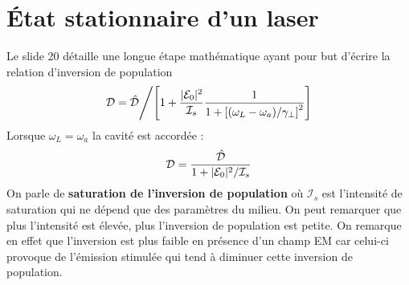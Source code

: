 \section{État stationnaire d'un laser}
Le slide 20 détaille une longue étape mathématique ayant pour but d'écrire la relation d'inversion
de population
\begin{equation}
{{\cal D}} = {{{\hat {\cal D}}} \mathord{\left/
 {\vphantom {{{\hat {\cal D}}} {\left[ {1 + \frac{{|{{\cal E}_0}{|^2}}}{{{{{\cal I}}_s}}}\frac{1}{{1 + {{[({\omega _L} - {\omega _a})/{\gamma _ \bot }]}^2}}}} \right]}}} \right.
 \kern-\nulldelimiterspace} {\left[ {1 + \frac{{|{{\cal E}_0}{|^2}}}{{{{{\cal I}}_s}}}\frac{1}{{1 + {{[({\omega _L} - {\omega _a})/{\gamma _ \bot }]}^2}}}} \right]}}
\label{eq:ch3.5p}
\end{equation}
Lorsque $\omega_L=\omega_a$ la cavité est accordée :
\begin{equation}
{{\cal D}} = \frac{{{\hat {\cal D}}}}{{1 + |{{\cal E}_0}{|^2}/{{{\cal I}}_s}}}
\end{equation}
On parle de \textbf{saturation de l'inversion de population} où $\mathcal{I}_s$ est l'intensité de 
saturation qui ne dépend que des paramètres du milieu. On peut remarquer que plus l'intensité est 
élevée, plus l'inversion de population est petite. On remarque en effet que l'inversion est plus 
faible en présence d'un champ EM car celui-ci provoque de l'émission stimulée qui tend à diminuer
cette inversion de population. 

